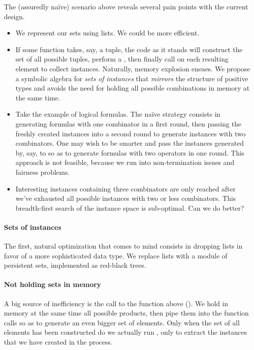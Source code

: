 The (assuredly naïve) scenario above reveals several pain points with the
current design.
\begin{itemize}
  \item We represent our sets using lists. We could be more efficient.
  \item If some function takes, say, a tuple, the code as it stands will construct
    the set of all possible tuples, perform a , then finally call
     on each resulting element to collect instances.
    Naturally, memory explosion ensues. We propose a symbolic algebra for
    \emph{sets of instances} that \emph{mirrors} the structure of positive
    types and avoids the need for holding all possible combinations in
    memory at the same time.
  \item Take the example of logical formulas. The naïve strategy consists in
    generating formulas with one combinator in a first round, then passing the
    freshly created instances into a second round to generate instances with two
    combinators.  One may wish to be smarter and pass the instances generated
    by, say,  to  so as to generate formulas with
    two operators in one round.  This approach is not feasible, because we run
    into non-termination issues and fairness problems.
  \item Interesting instances containing three combinators are only reached
    after we've exhausted all possible instances with two or less combinators.
    This breadth-first search of the instance space is sub-optimal. Can we do
    better?
\end{itemize}
%

\paragraph{Sets of instances}
The first, natural optimization that comes to mind consists in dropping lists in
favor of a more sophisticated data type. We replace lists with a module
 of persistent sets, implemented as red-black trees.


\paragraph{Not holding sets in memory}
A big source of inefficiency is the call to the
 function above (). We hold in memory
at the same time all possible products, then pipe them into the function calls
so as to generate an even bigger set of elements. Only when the set of all
elements has been constructed do we actually run , only to
extract the instances that we have created in the process.


